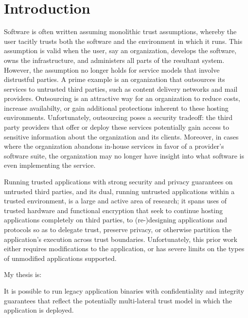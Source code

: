 \section{Introduction}
\label{sec:intro}

Software is often written assuming monolithic trust assumptions, whereby
the user tacitly trusts both the software and the environment in which it runs.
%
This assumption is valid when the user, say an organization, develops the
software, owns the infrastructure, and administers all parts of the resultant
system.
%
However, the assumption no longer holds for service models that involve
distrustful parties.
%
A prime example is an organization that outsources its services to untrusted
third parties, such as content delivery networks and mail providers.
%
Outsourcing is an attractive way for an organization to reduce costs,
increase availabilty, or gain additional protections inherent to these hosting
environments.
%
Unfortunately, outsourcing poses a security tradeoff: the third party
providers that offer or deploy these services potentially gain access to
sensitive information about the organization and its clients.   
%
Moreover, in cases where the organization abandons in-house services in favor
of a provider's software suite, the organization may no longer have insight
into what software is even implementing the service.


%
Running trusted applications with strong security and privacy guarantees on untrusted
third parties, and its dual, running untrusted applications within a
trusted environment, is a large and active area of research; it spans uses of
trusted hardware and functional encryption that seek to continue hosting
applications completely on third parties, to (re-)designing applications and
protocols so as to delegate trust, preserve privacy, or otherwise partition
the application's execution across trust boundaries.
%
Unfortunately, this prior work either requires modifications to the
application, or has severe limits on the types of unmodified applications
supported.


My thesis is:
\begin{displayquote}
    It is possible to run legacy application binaries with confidentiality and
    integrity guarantees that reflect the potentially multi-lateral trust model
    in which the application is deployed.
\end{displayquote}

